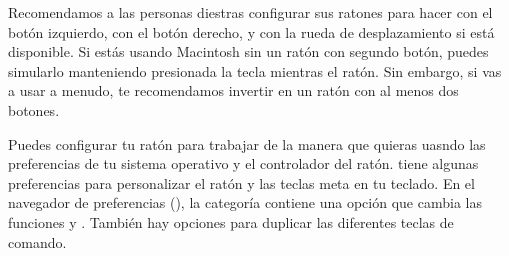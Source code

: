 \documentclass[a4paper,10pt,twoside]{book}
\begin{document}





Recomendamos a las personas diestras configurar sus ratones para hacer \click con el bot\'on izquierdo, \actclick con el bot\'on derecho, y \metaclick con la rueda de desplazamiento si est\'a disponible.
Si est\'as usando Macintosh sin un rat\'on con segundo bot\'on, puedes simularlo manteniendo presionada la tecla \clover{} mientras  el rat\'on. Sin embargo, si vas a usar \pharo a menudo, te recomendamos invertir en un rat\'on con al menos dos botones.

Puedes configurar tu rat\'on para trabajar de la manera que quieras uasndo las preferencias de tu sistema operativo y el controlador del rat\'on.
\pharo tiene algunas preferencias para personalizar el rat\'on y las teclas meta en tu teclado.
En el navegador de preferencias (), la categor\'ia  contiene una opci\'on  que cambia las funciones \actclick y \metaclick.
Tambi\'en hay opciones para duplicar las diferentes teclas de comando.   
\end{document}
